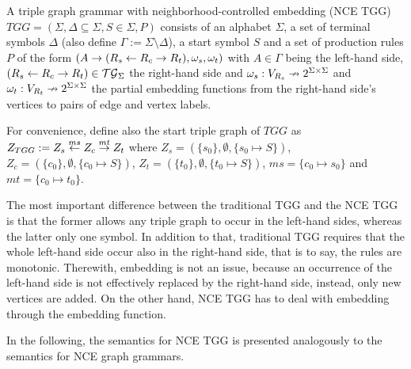 \documentclass[runningheads]{llncs}
\begin{document}
\begin{definition}
	A triple graph grammar with neighborhood-controlled embedding (NCE TGG) $TGG = (\Sigma, \Delta \subseteq \Sigma, S \in \Sigma, P)$ consists of an alphabet $\Sigma$, a set of terminal symbols $\Delta$ (also define $\Gamma := \Sigma \setminus \Delta$), a start symbol $S$ and a set of production rules $P$ of the form $(A \to (R_s \overset{}{\leftarrow} R_c \overset{}{\rightarrow} R_t), \omega_s, \omega_t)$ with $A \in \Gamma$ being the left-hand side, $(R_s \overset{}{\leftarrow} R_c \overset{}{\rightarrow} R_t) \in \mathcal{TG}_{\Sigma}$ the right-hand side and $\omega_s : V_{R_s} \nrightarrow 2^{\Sigma \times \Sigma}$ and $\omega_t : V_{R_t} \nrightarrow 2^{\Sigma \times \Sigma}$ the partial embedding functions from the right-hand side's vertices to pairs of edge and vertex labels.
\end{definition}

For convenience, define also the start triple graph of $TGG$ as $Z_{TGG} := Z_s \overset{ms}{\leftarrow} Z_c \overset{mt}{\rightarrow} Z_t$ where $Z_s = (\{s_0\},\emptyset,\{s_0 \mapsto S\})$, $Z_c = (\{c_0\},\emptyset,\{c_0 \mapsto S\})$, $Z_t = (\{t_0\},\emptyset,\{t_0 \mapsto S\})$, $ms = \{c_0 \mapsto s_0 \}$ and $mt = \{c_0 \mapsto t_0 \}$.

The most important difference between the traditional TGG and the NCE TGG is that the former allows any triple graph to occur in the left-hand sides, whereas the latter only one symbol. In addition to that, traditional TGG requires that the whole left-hand side occur also in the right-hand side, that is to say, the rules are monotonic. Therewith, embedding is not an issue, because an occurrence of the left-hand side is not effectively replaced by the right-hand side, instead, only new vertices are added. On the other hand, NCE TGG has to deal with embedding through the embedding function.

In the following, the semantics for NCE TGG is presented analogously to the semantics for NCE graph grammars.
\end{document}
